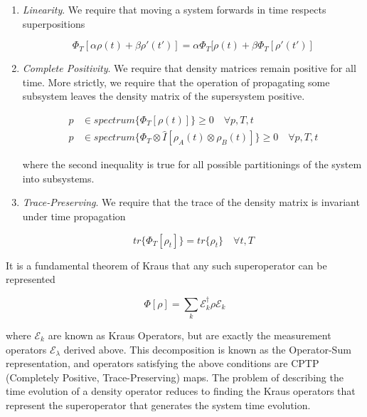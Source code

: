 \begin{enumerate}
    \item \emph{Linearity}. We require that moving a system forwards in time respects superpositions 

        \begin{equation}
            \Phi_T[\alpha\rho(t) + \beta\rho'(t')] = \alpha \Phi_T[\rho(t) + \beta \Phi_T[\rho'(t')]
        \end{equation}

    \item \emph{Complete Positivity}.  We require that density matrices remain positive for all time.
        More strictly, we require that the operation of propagating some subsystem leaves the density matrix of the supersystem positive.

        \begin{align}
            p & \in  spectrum \{\Phi_T[\rho(t)]\} \geq  0\quad \forall p, T, t\\
            p & \in  spectrum \{\Phi_T \otimes \hat{I} [\rho_A(t) \otimes\rho_B(t) ] \} \geq 0 \quad \forall p, T, t
        \end{align}

        where the second inequality is true for all possible partitionings of the system into subsystems.

    \item \emph{Trace-Preserving}. We require that the trace of the density matrix is invariant under time propagation

        \begin{equation}
            tr\{ \Phi_T[\rho_t] \} = tr \{ \rho_t \} \quad \forall t, T
        \end{equation}

\end{enumerate}

It is a fundamental theorem of Kraus \cite{Kraus1983} that any such superoperator can be represented\cite{Nielsen2010}

\begin{equation}
    \Phi[\rho] = \sum_k \mathscr{E}_k^\dagger \rho \mathscr{E}_k
\end{equation}

where $\mathscr{E}_k $ are known as Kraus Operators, but are exactly the measurement operators $\mathscr{E}_\lambda$ derived above.
This decomposition is known as the Operator-Sum representation\cite{Nielsen2010}, and operators satisfying the above conditions are CPTP (Completely Positive, Trace-Preserving) maps.
The problem of describing the time evolution of a density operator reduces to finding the Kraus operators that represent the superoperator that generates the system time evolution.

